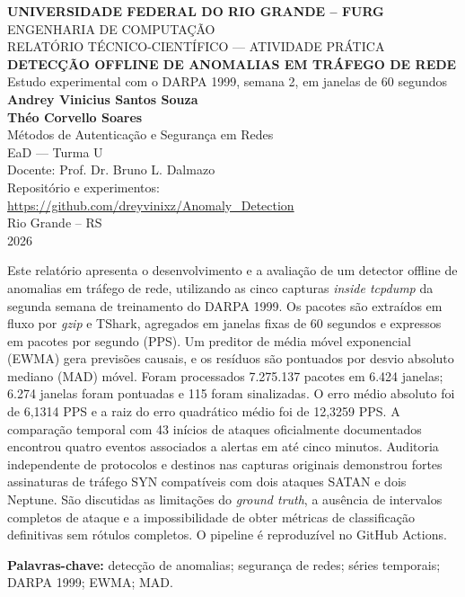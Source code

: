 \documentclass[12pt,oneside,a4paper,brazil]{abntex2}
\newcommand{\artifact}{\url{https://github.com/dreyvinixz/Anomaly_Detection}}
\begin{document}
\begin{titlingpage}
\begin{center}
{\large\bfseries UNIVERSIDADE FEDERAL DO RIO GRANDE -- FURG}\\[0.55cm]
{\large ENGENHARIA DE COMPUTAÇÃO}\\[0.35cm]
{\normalsize RELATÓRIO TÉCNICO-CIENTÍFICO --- ATIVIDADE PRÁTICA}\\
\vspace{2.5cm}
{\Large\bfseries DETECÇÃO OFFLINE DE ANOMALIAS EM TRÁFEGO DE REDE}\\[0.35cm]
{\large Estudo experimental com o DARPA 1999, semana 2, em janelas de 60 segundos}\\
\vspace{2.3cm}
{\large\bfseries Andrey Vinicius Santos Souza}\\[0.20cm]
{\large\bfseries Théo Corvello Soares}\\[0.7cm]
{\normalsize Métodos de Autenticação e Segurança em Redes}\\[0.16cm]
{\normalsize EaD --- Turma U}\\[0.22cm]
{\normalsize Docente: Prof. Dr. Bruno L. Dalmazo}\\
\vfill
{\normalsize Repositório e experimentos:}\\[0.25cm]
{\small \artifact}\\
\vfill
{\large Rio Grande -- RS}\\[0.15cm]
{\large 2026}
\end{center}
\end{titlingpage}
\begin{resumo}
Este relatório apresenta o desenvolvimento e a avaliação de um detector offline de anomalias em tráfego de rede, utilizando as cinco capturas \textit{inside tcpdump} da segunda semana de treinamento do DARPA 1999. Os pacotes são extraídos em fluxo por \textit{gzip} e TShark, agregados em janelas fixas de 60 segundos e expressos em pacotes por segundo (PPS). Um preditor de média móvel exponencial (EWMA) gera previsões causais, e os resíduos são pontuados por desvio absoluto mediano (MAD) móvel. Foram processados 7.275.137 pacotes em 6.424 janelas; 6.274 janelas foram pontuadas e 115 foram sinalizadas. O erro médio absoluto foi de 6,1314 PPS e a raiz do erro quadrático médio foi de 12,3259 PPS. A comparação temporal com 43 inícios de ataques oficialmente documentados encontrou quatro eventos associados a alertas em até cinco minutos. Auditoria independente de protocolos e destinos nas capturas originais demonstrou fortes assinaturas de tráfego SYN compatíveis com dois ataques SATAN e dois Neptune. São discutidas as limitações do \textit{ground truth}, a ausência de intervalos completos de ataque e a impossibilidade de obter métricas de classificação definitivas sem rótulos completos. O pipeline é reproduzível no GitHub Actions.

\vspace{0.35cm}
\noindent\textbf{Palavras-chave:} detecção de anomalias; segurança de redes; séries temporais; DARPA 1999; EWMA; MAD.
\end{resumo}
\tableofcontents*
\clearpage
\end{document}
